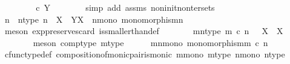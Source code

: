 \begin{isabellebody}
\ \ \ \ \isamarkupfalse%
\ \isamarkupfalse%
\ {\isachardoublequoteopen}{\isasymOmega}\ {\isasymle}\isactrlsub c\ Y{\isachardoublequoteclose}\isanewline
\ \ \ \ \ \ \isamarkupfalse%
\ {\isacharparenleft}{\kern0pt}simp\ add{\isacharcolon}{\kern0pt}\ assms{\isacharparenleft}{\kern0pt}{}{\isacharparenright}{\kern0pt}\ non{\isacharunderscore}{\kern0pt}init{\isacharunderscore}{\kern0pt}non{\isacharunderscore}{\kern0pt}ter{\isacharunderscore}{\kern0pt}sets{\isacharparenright}{\kern0pt}\isanewline
\ \ \ \ \isamarkupfalse%
\ \isamarkupfalse%
\ n\ \ n{\isacharunderscore}{\kern0pt}type{\isacharcolon}{\kern0pt}\ {\isachardoublequoteopen}n\ {\isacharcolon}{\kern0pt}\ {\isasymOmega}\isactrlbsup X\isactrlesup \ {\isasymrightarrow}\ Y\isactrlbsup X\isactrlesup {\isachardoublequoteclose}\ \ n{\isacharunderscore}{\kern0pt}mono{\isacharcolon}{\kern0pt}\ {\isachardoublequoteopen}monomorphism{\isacharparenleft}{\kern0pt}n{\isacharparenright}{\kern0pt}{\isachardoublequoteclose}\isanewline
\ \ \ \ \ \ \isamarkupfalse%
\ {\isacharparenleft}{\kern0pt}meson\ exp{\isacharunderscore}{\kern0pt}preserves{\isacharunderscore}{\kern0pt}card{}\ is{\isacharunderscore}{\kern0pt}smaller{\isacharunderscore}{\kern0pt}than{\isacharunderscore}{\kern0pt}def{\isacharparenright}{\kern0pt}\isanewline
\ \ \ \ \isamarkupfalse%
\ \isamarkupfalse%
\ mn{\isacharunderscore}{\kern0pt}type{\isacharcolon}{\kern0pt}\ {\isachardoublequoteopen}m\ {\isasymcirc}\isactrlsub c\ n\ {\isacharcolon}{\kern0pt}\ \ {\isasymOmega}\isactrlbsup X\isactrlesup \ {\isasymrightarrow}\ X{\isachardoublequoteclose}\isanewline
\ \ \ \ \ \ \isamarkupfalse%
\ {\isacharparenleft}{\kern0pt}meson\ comp{\isacharunderscore}{\kern0pt}type\ m{\isacharunderscore}{\kern0pt}type{\isacharparenright}{\kern0pt}\isanewline
\ \ \ \ \isamarkupfalse%
\ mn{\isacharunderscore}{\kern0pt}mono{\isacharcolon}{\kern0pt}\ {\isachardoublequoteopen}monomorphism{\isacharparenleft}{\kern0pt}m\ {\isasymcirc}\isactrlsub c\ n{\isacharparenright}{\kern0pt}{\isachardoublequoteclose}\isanewline
\ \ \ \ \ \ \isamarkupfalse%
\ cfunc{\isacharunderscore}{\kern0pt}type{\isacharunderscore}{\kern0pt}def\ composition{\isacharunderscore}{\kern0pt}of{\isacharunderscore}{\kern0pt}monic{\isacharunderscore}{\kern0pt}pair{\isacharunderscore}{\kern0pt}is{\isacharunderscore}{\kern0pt}monic\ m{\isacharunderscore}{\kern0pt}mono\ m{\isacharunderscore}{\kern0pt}type\ n{\isacharunderscore}{\kern0pt}mono\ n{\isacharunderscore}{\kern0pt}type\ \isamarkupfalse%

\end{isabellebody}
